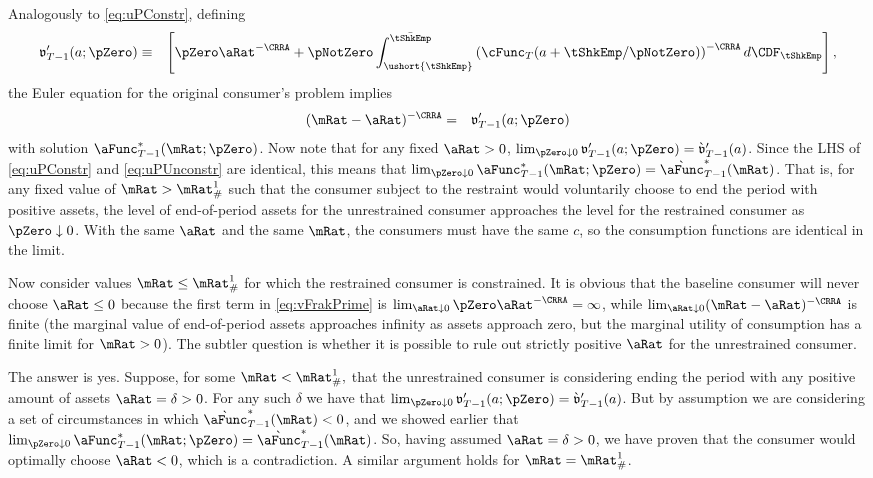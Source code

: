 \documentclass[titlepage]{\econtex}\providecommand{\texname}{BufferStockTheory}%
\begin{document}
Analogously to \eqref{eq:uPConstr}, defining
\begin{eqnarray}
  \mathfrak{v}_{T-1}^{\prime}(a;\pZero) & \equiv & \left[\pZero \aRat^{-\CRRA}+\pNotZero\int_{\ushort{\tShkEmp}}^{\bar{\tShkEmp}} \left(\cFunc_{T}(a+\tShkEmp/\pNotZero)\right)^{-\CRRA} d\CDF_{\tShkEmp}\right], \label{eq:vFrakPrime}
\end{eqnarray}
the Euler equation for the original consumer's problem implies
\begin{eqnarray}
 (\mRat-\aRat)^{-\CRRA} & = & \mathfrak{v}_{T-1}^{\prime}(a;\pZero) \label{eq:uPUnconstr}
\end{eqnarray}
with solution $\aFunc_{T-1}^{*}(\mRat;\pZero)$.  Now note that for any
fixed $\aRat>0$, $\lim_{\pZero \downarrow 0}
\mathfrak{v}_{T-1}^{\prime}(a;\pZero) =
\grave{\mathfrak{v}}_{T-1}^{\prime}(a)$.  Since the LHS of
\eqref{eq:uPConstr} and \eqref{eq:uPUnconstr} are identical, this
means that $\lim_{\pZero \downarrow 0}
\aFunc_{T-1}^{*}(\mRat;\pZero) =
\grave{\aFunc}_{T-1}^{*}(\mRat)$.  That is, for any fixed value of
$\mRat > \mRat^{1}_{\#}$ such that the consumer subject to the
restraint would voluntarily choose to end the period with positive
assets, the level of end-of-period assets for the unrestrained
consumer approaches the level for the restrained consumer as $\pZero
\downarrow 0$.  With the same $\aRat$ and the same $\mRat$, the
consumers must have the same $c$, so the consumption functions are
identical in the limit.

Now consider values $\mRat\leq \mRat^{1}_{\#}$ for which the restrained consumer
is constrained.  It is obvious that the baseline consumer will never
choose $\aRat \leq 0$ because the first term in \eqref{eq:vFrakPrime} is $\lim_{\aRat \downarrow 0} \pZero  \aRat^{-\CRRA} =
\infty$, while $\lim_{\aRat \downarrow 0} (\mRat-\aRat)^{-\CRRA}$ is finite (the
marginal value of end-of-period assets approaches infinity as assets approach
zero, but the marginal utility of consumption has a finite limit for $\mRat>0$).
The subtler question is whether it is possible to rule out strictly positive
$\aRat$ for the unrestrained consumer.

The answer is yes.  Suppose, for some $\mRat < \mRat^{1}_{\#},$ that the
unrestrained consumer is considering ending the period with any
positive amount of assets $\aRat=\delta > 0$.  For any such $\delta$ we
have that $\lim_{\pZero  \downarrow 0} \mathfrak{v}_{T-1}^{\prime}(a;\pZero)=\grave{\mathfrak{v}}_{T-1}^{\prime}(a)$.
But by assumption we are considering a set of circumstances in which
$\grave{\aFunc}_{T-1}^{*}(\mRat) < 0$, and we showed earlier that
$\lim_{\pZero  \downarrow 0} \aFunc_{T-1}^{*}(\mRat;\pZero) = \grave{\aFunc}_{T-1}^{*}(\mRat)$.  So,
having assumed $\aRat = \delta > 0$, we have proven that the consumer
would optimally choose $\aRat < 0$, which is a contradiction.  A similar
argument holds for $\mRat = \mRat^{1}_{\#}$.
\end{document}
